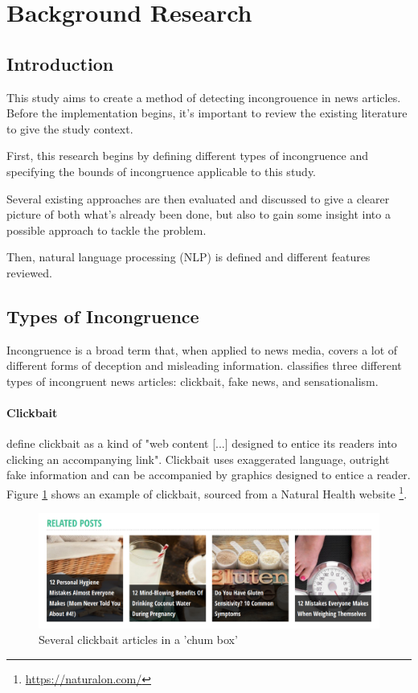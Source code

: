 \section{Background Research}
\subsection{Introduction}
This study aims to create a method of detecting incongrouence in news articles. Before the implementation begins, it's important to review the existing literature to give the study context.

First, this research begins by defining different types of incongruence and specifying the bounds of incongruence applicable to this study. 

Several existing approaches are then evaluated and discussed to give a clearer picture of both what's already been done, but also to gain some insight into a possible approach to tackle the problem.

Then, natural language processing (NLP) is defined and different features reviewed.  

\subsection{Types of Incongruence}
Incongruence is a broad term that, when applied to news media, covers a lot of different forms of deception and misleading information.  classifies three different types of incongruent news articles: clickbait, fake news, and sensationalism.

\paragraph{Clickbait}
 define clickbait as a kind of "web content [...] designed to entice its readers into clicking an accompanying link". Clickbait uses exaggerated language, outright fake information and can be accompanied by graphics designed to entice a reader. Figure \ref{fig:clickbait} shows an example of clickbait, sourced from a Natural Health website \footnote{\url{https://naturalon.com/}}.

\begin{figure}[ht!]
  \includegraphics[width=\linewidth]{images/clickbait.png}
  \caption{Several clickbait articles in a 'chum box'}
  \label{fig:clickbait}
\end{figure}

